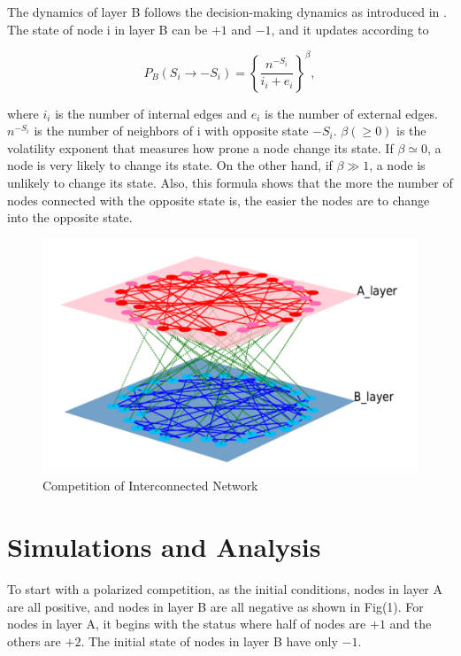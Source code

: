 \documentclass[english]{cccconf}
\begin{document}
The dynamics of layer B follows the decision-making dynamics as introduced in \cite{abrams2003, vazquez2010}. The state of node i in layer B can be $+1$ and $-1$, and it updates according to

\begin{equation}
P_B(S_i \rightarrow -S_i)= \left \{\frac{n^{-S_i}}{i_i + e_i}\right \}^\beta,
\end{equation}

where $i_i$ is the number of internal edges and $e_i$ is the number of external edges. $n^{-S_i}$ is the number of neighbors of i with opposite state $-S_i$. $\beta(\geq 0)$ is the volatility exponent that measures how prone a node change its state. If $\beta \simeq 0$, a node is very likely to change its state. On the other hand, if $\beta \gg 1$, a node is unlikely to change its state. Also, this formula shows that the more the number of nodes connected with the opposite state is, the easier the nodes are to change into the opposite state.\\
\begin{figure}[!htb]
  \centering
  \includegraphics[width=\hsize]{FIG1.png}
  \caption{Competition of Interconnected Network}
  \label{Fig1}
\end{figure}


\section{Simulations and Analysis}
To start with a polarized competition, as the initial conditions,  nodes in layer A are all positive, and nodes in layer B are all negative as shown in Fig(1). For nodes in layer A, it begins with the status where half of nodes are $+1$ and the others are $+2$. The initial state of nodes in layer B have only $-1$. 
\end{document}
